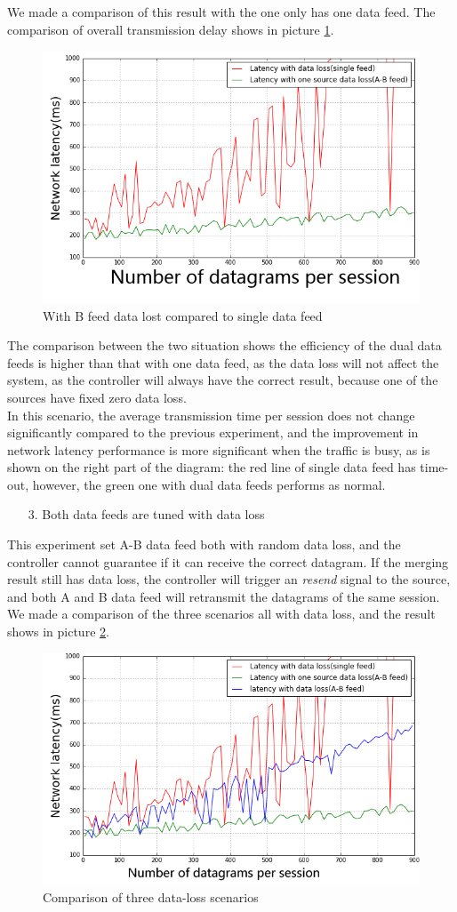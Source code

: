 \documentclass[11pt,openright,a4paper]{report}
\begin{document}
We made a comparison of this result with the one only has one data feed. The comparison of overall transmission delay shows in picture \ref{fig:oneDataLost}.\\
\begin{figure}[H]
\centering
\includegraphics[width=0.7\linewidth]{picture/experiments/exp2/oneDataLost}
\caption{With B feed data lost compared to single data feed}
\label{fig:oneDataLost}
\end{figure}
The comparison between the two situation shows the efficiency of the dual data feeds is higher than that with one data feed, as the data loss will not affect the system, as the controller will always have the correct result, because one of the sources have fixed zero data loss.\\
In this scenario, the average transmission time per session does not change significantly compared to the previous experiment, and the improvement in network latency performance is more significant when the traffic is busy, as is shown on the right part of the diagram: the red line of single data feed has time-out, however, the green one with dual data feeds performs as normal.\\
\begin{itemize}
	\item[3.] Both data feeds are tuned with data loss
\end{itemize}
This experiment set A-B data feed both with random data loss, and the controller cannot guarantee if it can receive the correct datagram. If the merging result still has data loss, the controller will trigger an \textit{resend} signal to the source, and both A and B data feed will retransmit the datagrams of the same session.\\
We made a comparison of the three scenarios all with data loss, and the result shows in picture \ref{fig:twoDataloss}.
\begin{figure}[H]
\centering
\includegraphics[width=0.7\linewidth]{picture/experiments/exp2/twoDataloss}
\caption{Comparison of three data-loss scenarios}
\label{fig:twoDataloss}
\end{figure}
\end{document}
